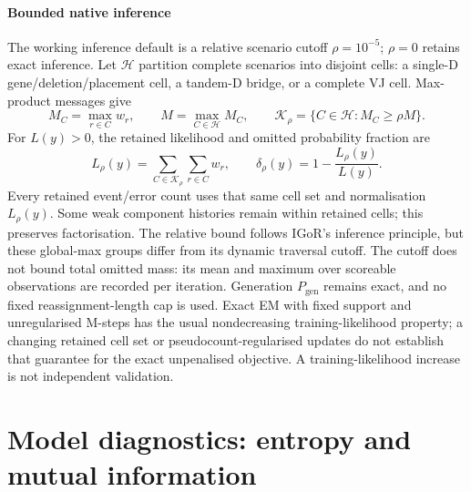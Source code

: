 \documentclass[11pt]{article}
\theoremstyle{oldplain}
\theoremstyle{oldrem}
\newcommand{\Pgen}{P_{\mathrm{gen}}}
\begin{document}
\paragraph{Bounded native inference} The working inference default is a relative
scenario cutoff $\rho=10^{-5}$; $\rho=0$ retains exact inference. Let $\mathcal{H}$
partition complete scenarios into disjoint cells: a single-D gene/deletion/placement
cell, a tandem-D bridge, or a complete VJ cell. Max-product messages give
\begin{equation}
 M_C=\max_{r\in C} w_r,\qquad M=\max_{C\in\mathcal{H}}M_C,\qquad
 \mathcal{K}_{\rho}=\{C\in\mathcal{H}: M_C\ge\rho M\}.
\end{equation}
For $L(y)>0$, the retained likelihood and omitted probability fraction are
\begin{equation}
 L_{\rho}(y)=\sum_{C\in\mathcal{K}_{\rho}}\sum_{r\in C}w_r,\qquad
 \delta_{\rho}(y)=1-\frac{L_{\rho}(y)}{L(y)}.
\end{equation}
Every retained event/error count uses that same cell set and normalisation
$L_{\rho}(y)$. Some weak component histories remain within retained cells; this
preserves factorisation. The relative bound follows IGoR's inference principle,
but these global-max groups differ from its dynamic traversal cutoff. The cutoff
does not bound total omitted mass: its mean and maximum over scoreable observations
are recorded per iteration. Generation $\Pgen$ remains exact, and no fixed
reassignment-length cap is used.
Exact EM with fixed support and unregularised M-steps has the usual
nondecreasing training-likelihood property; a changing retained cell set or
pseudocount-regularised updates do not establish that guarantee for the exact
unpenalised objective.
A training-likelihood increase is not independent validation.

\section{Model diagnostics: entropy and mutual information}\label{sec:diag}
\end{document}
